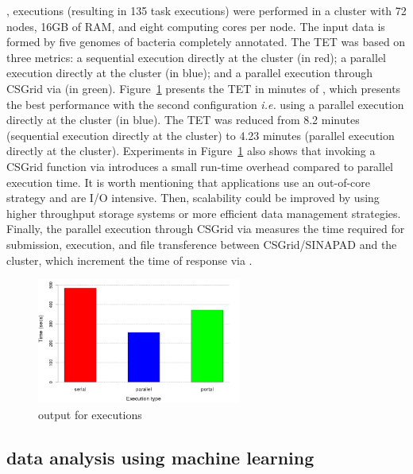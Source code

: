 \vspace{5px}
\noindent
\underline{\textbf{\swift}}, executions (resulting in 135 task executions) were performed in a cluster with 72 nodes, 16GB of RAM, and eight computing cores per node. The input data is formed by five genomes of bacteria completely annotated. The TET was based on three metrics: a sequential execution directly at the cluster (in red); a parallel execution directly at the cluster (in blue); and a parallel execution through CSGrid via \system (in green). Figure~\ref{fig:swiftgeckoTET} presents the TET in minutes of \swift, which presents the best performance with the second configuration \textit{i.e.} using a parallel execution directly at the cluster (in blue). The TET was reduced from 8.2 minutes (sequential execution directly at the cluster) to 4.23 minutes (parallel execution directly at the cluster). Experiments in Figure~\ref{fig:swiftgeckoTET} also shows that invoking a CSGrid function via \system introduces a small run-time overhead compared to parallel execution time. It is worth mentioning that \swift applications use an out-of-core strategy and are I/O intensive. Then, scalability could be improved by using higher throughput storage systems or more efficient data management strategies. Finally, the parallel execution through CSGrid via \system measures the time required for submission, execution, and file transference between CSGrid/SINAPAD and the cluster, which increment the time of response via \system.

\begin{figure}[!htb]
\centering
\includegraphics[width=0.6\textwidth]{imgs/swiftgeckoTET.png}
\vspace{-12px}
\caption{\system output for \swift executions}
\label{fig:swiftgeckoTET}
\end{figure}

\subsection{\system data analysis using machine learning}

